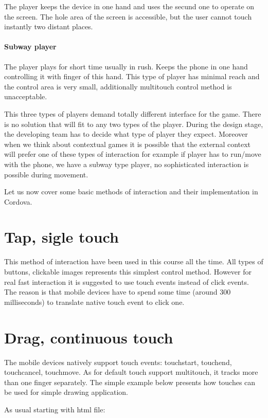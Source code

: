 The player keeps the device in one hand and uses the secund one to operate on the screen. The hole area of the screen is accessible, but the user cannot touch instantly two distant places.

\paragraph*{Subway player}

The player plays for short time usually in rush. Keeps the phone in one hand controlling it with finger of this hand. This type of player has minimal reach and the control area is very small, additionally  multitouch control method is unacceptable.

This three types of players demand totally different interface for the game. There is no solution that will fit to any two types of the player. During the design stage, the developing team has to decide what type of player they expect. Moreover when we think about contextual games it is possible that the external context will prefer one of these types of interaction for example if player has to run/move with the phone, we have a subway type player, no sophisticated  interaction is possible during movement.

Let us now cover some basic methods of interaction and their implementation in Cordova.

\section{Tap, sigle touch}
This method of interaction have been used in this course all the time. All types of buttons, clickable images represents this simplest control method. However for real fast interaction it is suggested to use touch events instead of click events. The reason is that mobile devices have to spend some time (around 300 milliseconds) to translate native touch event to click one.

\section{Drag, continuous touch}
The mobile devices natively support touch events: touchstart, touchend, touchcancel, touchmove. As for default touch support multitouch, it tracks more than one finger separately. The simple example below presents how touches can be used for simple drawing application.

As usual starting with html file:

